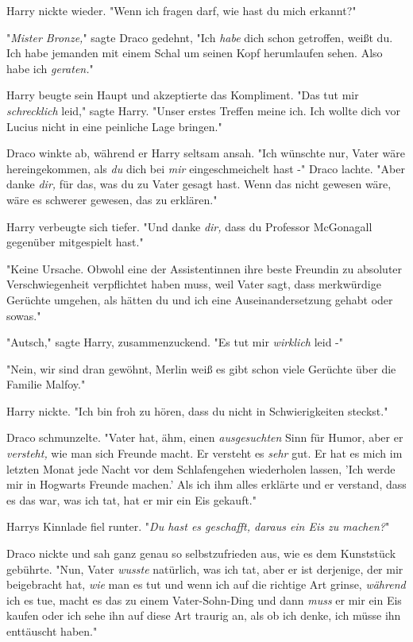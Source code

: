 {Harry nickte wieder. "Wenn ich fragen darf, wie hast du mich erkannt?"

"\emph{Mister Bronze,}" sagte Draco gedehnt, "Ich \emph{habe} dich schon getroffen, weißt du. Ich habe jemanden mit einem Schal um seinen Kopf herumlaufen sehen. Also habe ich \emph{geraten.}"

Harry beugte sein Haupt und akzeptierte das Kompliment. "Das tut mir \emph{schrecklich} leid," sagte Harry. "Unser erstes Treffen meine ich. Ich wollte dich vor Lucius nicht in eine peinliche Lage bringen."

Draco winkte ab, während er Harry seltsam ansah. "Ich wünschte nur, Vater wäre hereingekommen, als \emph{du} dich bei \emph{mir} eingeschmeichelt hast -" Draco lachte. "Aber danke \emph{dir,} für das, was du zu Vater gesagt hast. Wenn das nicht gewesen wäre, wäre es schwerer gewesen, das zu erklären."

Harry verbeugte sich tiefer. "Und danke \emph{dir,} dass du Professor McGonagall gegenüber mitgespielt hast."

"Keine Ursache. Obwohl eine der Assistentinnen ihre beste Freundin zu absoluter Verschwiegenheit verpflichtet haben muss, weil Vater sagt, dass merkwürdige Gerüchte umgehen, als hätten du und ich eine Auseinandersetzung gehabt oder sowas."

"Autsch," sagte Harry, zusammenzuckend. "Es tut mir \emph{wirklich} leid -"

"Nein, wir sind dran gewöhnt, Merlin weiß es gibt schon viele Gerüchte über die Familie Malfoy."

Harry nickte. "Ich bin froh zu hören, dass du nicht in Schwierigkeiten steckst."

Draco schmunzelte. "Vater hat, ähm, einen \emph{ausgesuchten} Sinn für Humor, aber er \emph{versteht,} wie man sich Freunde macht. Er versteht es \emph{sehr} gut. Er hat es mich im letzten Monat jede Nacht vor dem Schlafengehen wiederholen lassen, 'Ich werde mir in Hogwarts Freunde machen.' Als ich ihm alles erklärte und er verstand, dass es das war, was ich tat, hat er mir ein Eis gekauft."

Harrys Kinnlade fiel runter. "\emph{Du hast es geschafft, daraus ein Eis zu machen?}"

Draco nickte und sah ganz genau so selbstzufrieden aus, wie es dem Kunststück gebührte. "Nun, Vater \emph{wusste} natürlich, was ich tat, aber er ist derjenige, der mir beigebracht hat, \emph{wie} man es tut und wenn ich auf die richtige Art grinse, \emph{während} ich es tue, macht es das zu einem Vater-Sohn-Ding und dann \emph{muss} er mir ein Eis kaufen oder ich sehe ihn auf diese Art traurig an, als ob ich denke, ich müsse ihn enttäuscht haben."

}
